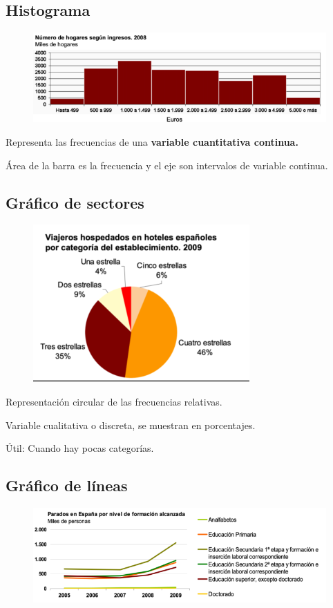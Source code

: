 \documentclass[12pt, twoside, openright]{report} %
\begin{document}
\subsection{Histograma}

\begin{figure}[H]
	{\includegraphics[scale=.4]{Untitled 7.png}}
\end{figure}
Representa las frecuencias de una \textbf{variable cuantitativa
	continua.}

Área de la barra es la frecuencia y el eje son intervalos de variable
continua.

\subsection{Gráfico de sectores}
\vspace{-1cm}
\begin{figure}[H]
	{\includegraphics[scale=.5]{Untitled 8.png}}
\end{figure}

Representación circular de las frecuencias relativas.

Variable cualitativa o discreta, se muestran en porcentajes.

Útil: Cuando hay pocas categorías.

\subsection{Gráfico de líneas}
\begin{figure}[H]
	{\includegraphics[scale=.5]{Untitled 9.png}}
\end{figure}
\end{document}
